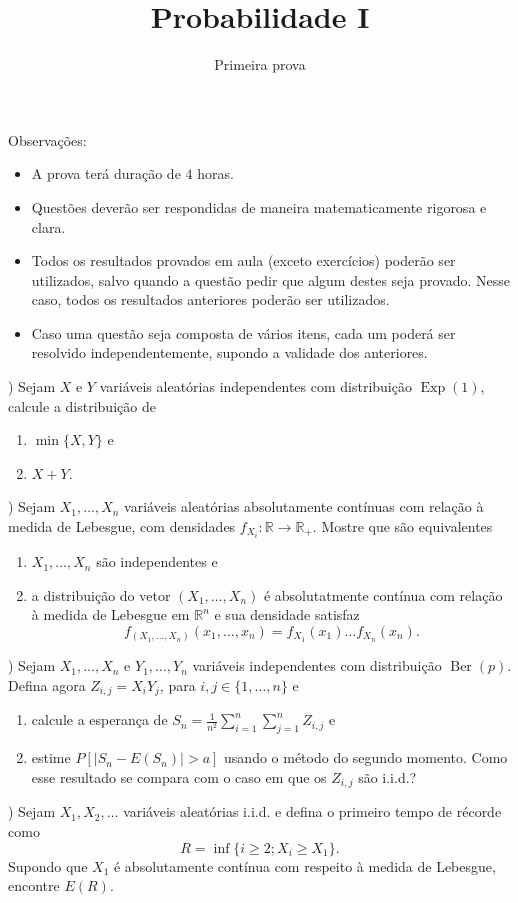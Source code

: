 \documentclass{article}
\DeclareMathOperator{\Ber}{Ber}
\DeclareMathOperator{\Exp}{Exp}
\newcommand*\1{\mathds{1}}
\begin{document}
\title{Probabilidade I}
\author{Primeira prova}

\maketitle

\noindent Observa\c{c}\~oes:
\begin{itemize}
\item A prova ter\'a dura\c{c}\~ao de $ 4 $ horas.
\item Quest\~oes dever\~ao ser respondidas de maneira ma\-te\-ma\-ti\-ca\-men\-te rigorosa e clara.
\item Todos os resultados provados em aula (exceto exerc\'icios) poder\~ao ser utilizados, salvo quando a quest\~ao pedir que algum destes seja provado. Nesse caso, todos os resultados anteriores poder\~ao ser utilizados.
\item Caso uma quest\~ao seja composta de v\'arios itens, cada um poder\'a ser resolvido independentemente, supondo a validade dos anteriores.
\end{itemize}

\vspace{4mm}
) Sejam $X$ e $Y$ variáveis aleatórias independentes com distribuição $\Exp(1)$, calcule a distribuição de
\begin{enumerate}[\quad a)]
\item $\min\{X,Y\}$ e
\item $X + Y$.
\end{enumerate}
\vspace{4mm}

) Sejam $X_1, \dots, X_n$ variáveis aleatórias absolutamente contínuas com relação à medida de Lebesgue, com densidades $f_{X_i}: \mathbb{R} \to \mathbb{R}_+$.
Mostre que são equivalentes
\begin{enumerate}[\quad a)]
\item $X_1, \dots, X_n$ são independentes e
\item a distribuição do vetor $(X_1, \dots, X_n)$ é absolutatmente contínua com relação à medida de Lebesgue em $\mathbb{R}^n$ e sua densidade satisfaz
  \begin{equation}
    f_{(X_1, \dots, X_n)}(x_1, \dots, x_n) = f_{X_1} (x_1) \dots f_{X_n}(x_n).
  \end{equation}
\end{enumerate}
\medskip

\newpage

) Sejam $X_1, \dots, X_n$ e $Y_1, \dots, Y_n$ variáveis independentes com distribuição $\Ber(p)$.
Defina agora $Z_{i,j} = X_i Y_j$, para $i, j \in \{1, \dots, n\}$ e
\begin{enumerate}[\quad a)]
\item calcule a esperança de $S_n = \tfrac{1}{n^2} \sum_{i=1}^n \sum_{j=1}^n Z_{i,j}$ e
\item estime $P[|S_n - E(S_n)| > a]$ usando o método do segundo momento. Como esse resultado se compara com o caso em que os $Z_{i,j}$ são i.i.d.?
\end{enumerate}

\vspace{4mm}

) Sejam $X_1, X_2, \dots$ variáveis aleatórias i.i.d. e defina o primeiro tempo de récorde como
\begin{equation}
  R = \inf\{i \geq 2; X_i \geq X_1\}.
\end{equation}
Supondo que $X_1$ é absolutamente contínua com respeito à medida de Lebesgue, encontre $E(R)$.
\medskip
\end{document}

